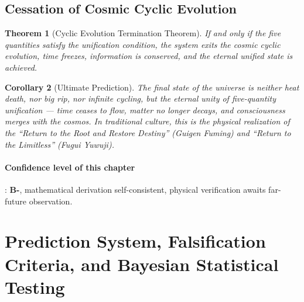 \documentclass[12pt,a4paper,twocolumn]{article}
\newtheorem{theorem}{Theorem}[section]
\newtheorem{corollary}[theorem]{Corollary}
\begin{document}
\subsection{Cessation of Cosmic Cyclic Evolution}

\begin{theorem}[Cyclic Evolution Termination Theorem]
If and only if the five quantities satisfy the unification condition, the system exits the cosmic cyclic evolution, time freezes, information is conserved, and the eternal unified state is achieved.
\end{theorem}

\begin{corollary}[Ultimate Prediction]
The final state of the universe is neither heat death, nor big rip, nor infinite cycling, but the eternal unity of five-quantity unification --- time ceases to flow, matter no longer decays, and consciousness merges with the cosmos. In traditional culture, this is the physical realization of the ``Return to the Root and Restore Destiny'' (Guigen Fuming) and ``Return to the Limitless'' (Fugui Yuwuji).
\end{corollary}

\paragraph{Confidence level of this chapter}: \textbf{B-}, mathematical derivation self-consistent, physical verification awaits far-future observation.

\section{Prediction System, Falsification Criteria, and Bayesian Statistical Testing}
\end{document}
